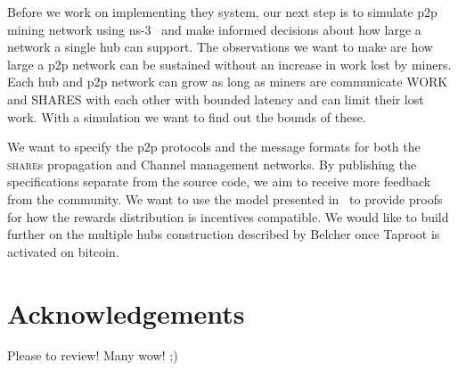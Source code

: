 \documentclass{article}
\begin{document}
Before we work on implementing they system, our next step is to
simulate p2p mining network using ns-3~\cite{ns3} and make informed
decisions about how large a network a single hub can support. The
observations we want to make are how large a p2p network can be
sustained without an increase in work lost by miners. Each hub and p2p
network can grow as long as miners are communicate WORK and SHARES
with each other with bounded latency and can limit their lost
work. With a simulation we want to find out the bounds of these.

We want to specify the p2p protocols and the message formats for both
the \textsc{share}s propagation and Channel management networks. By
publishing the specifications separate from the source code, we aim to
receive more feedback from the community. We want to use the model
presented in~\cite{incentives-compatible} to provide proofs for how
the rewards distribution is incentives compatible. We would like to
build further on the multiple hubs construction described by Belcher
once Taproot is activated on bitcoin.

\section{Acknowledgements}

Please to review! Many wow! ;)

 

\end{document}
